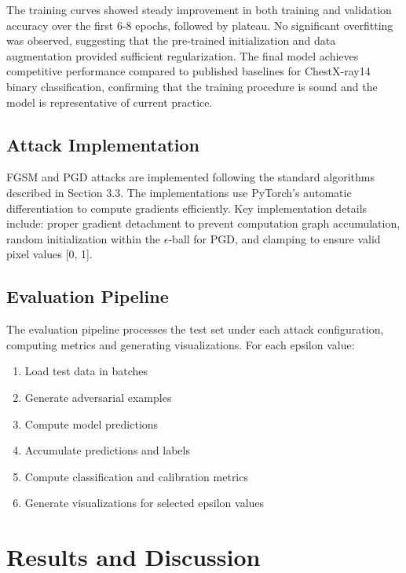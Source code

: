 \documentclass[12pt,a4paper]{article}
\begin{document}
The training curves showed steady improvement in both training and validation accuracy over the first 6-8 epochs, followed by plateau. No significant overfitting was observed, suggesting that the pre-trained initialization and data augmentation provided sufficient regularization. The final model achieves competitive performance compared to published baselines for ChestX-ray14 binary classification, confirming that the training procedure is sound and the model is representative of current practice.

\subsection{Attack Implementation}

FGSM and PGD attacks are implemented following the standard algorithms described in Section 3.3. The implementations use PyTorch's automatic differentiation to compute gradients efficiently. Key implementation details include: proper gradient detachment to prevent computation graph accumulation, random initialization within the $\epsilon$-ball for PGD, and clamping to ensure valid pixel values [0, 1].

\subsection{Evaluation Pipeline}

The evaluation pipeline processes the test set under each attack configuration, computing metrics and generating visualizations. For each epsilon value:

\begin{enumerate}[leftmargin=*]
    \item Load test data in batches
    \item Generate adversarial examples
    \item Compute model predictions
    \item Accumulate predictions and labels
    \item Compute classification and calibration metrics
    \item Generate visualizations for selected epsilon values
\end{enumerate}

\section{Results and Discussion}
\label{sec:results}
\end{document}
